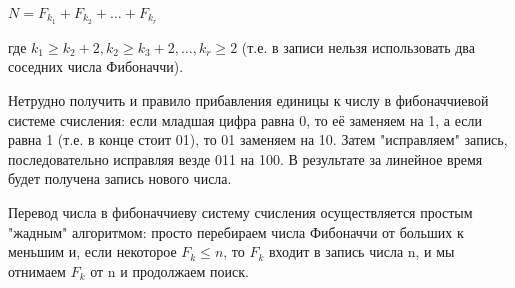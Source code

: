 \documentclass[a4paper]{article}
\begin{document}
\begin{multicols*}{2}
		 $N = F_{k_1} + F_{k_2} + \ldots + F_{k_r}$
		 
		 где $k_1 \ge k_2+2, k_2 \ge k_3+2, \ldots, k_r \ge 2$ (т.е. в записи нельзя использовать два соседних числа Фибоначчи).
		 
		 Нетрудно получить и правило прибавления единицы к числу в фибоначчиевой системе счисления: если младшая цифра равна 0, то её заменяем на 1, а если равна 1 (т.е. в конце стоит 01), то 01 заменяем на 10. Затем "исправляем" запись, последовательно исправляя везде 011 на 100. В результате за линейное время будет получена запись нового числа.
		 
		 Перевод числа в фибоначчиеву систему счисления осуществляется простым "жадным" алгоритмом: просто перебираем числа Фибоначчи от больших к меньшим и, если некоторое $F_k \le n$, то $F_k$ входит в запись числа n, и мы отнимаем $F_k$ от n и продолжаем поиск.
		 
		 
	\end{multicols*}
\end{document}
